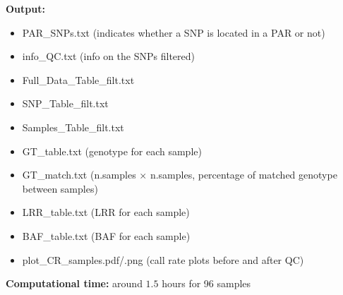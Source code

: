 \documentclass[11pt]{paper}
\begin{document}
\noindent\textbf{Output:} 
\begin{itemize}
\item PAR\_SNPs.txt (indicates whether a SNP is located in a PAR or not)
\item info\_QC.txt (info on the SNPs filtered)
\item Full\_Data\_Table\_filt.txt
\item SNP\_Table\_filt.txt
\item Samples\_Table\_filt.txt
\item GT\_table.txt (genotype for each sample)
\item GT\_match.txt (n.samples $\times$ n.samples, percentage of matched genotype between samples)
\item LRR\_table.txt (LRR for each sample)
\item BAF\_table.txt (BAF for each sample)
\item plot\_CR\_samples.pdf/.png (call rate plots before and after QC)
\end{itemize}

\noindent\textbf{Computational time:} around $1.5$ hours for 96 samples\\
\end{document}
